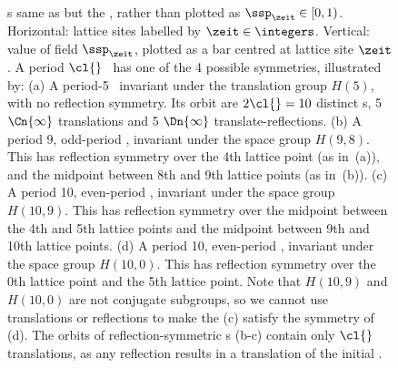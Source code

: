 \begin{description}
\begin{figure}
  \caption{\label{fig:HL1dLatticeStateColor}
{\Lattstate}s same as  but the , rather
than plotted as $\ssp_\zeit\in[0,1)$.
Horizontal: lattice sites labelled by $\zeit\in\integers$.
Vertical: value of
field $\ssp_\zeit$, plotted as a bar centred at lattice site
$\zeit$.
A period $\cl{}$ {\lattstate} \Xx\ has one of the
4 possible symmetries, illustrated by:
(a)
A period-5 {\lattstate} \Xx\ invariant under the translation group
$H(5)$, with no reflection symmetry. Its  orbit are $2\cl{}=10$
distinct {\lattstate}s, 5 $\Cn{\infty}$ translations and 5 $\Dn{\infty}$
translate-reflections.
(b)
A period 9, odd-period {\lattstate}
,
invariant under the space group $H(9,8)$.
This {\lattstate} has reflection
symmetry over the 4th lattice point
(as in \,(a)), and the midpoint between
8th and 9th lattice points (as in \,(b)).
(c)
A period 10, even-period {\lattstate}
,
invariant under the space group $H(10,9)$.
This {\lattstate} has reflection
symmetry over the midpoint between the 4th and 5th lattice points
and the midpoint between 9th and 10th lattice points.
(d)
A period 10, even-period {\lattstate}
,
invariant under the space group $H(10,0)$.
This {\lattstate} has reflection
symmetry over the 0th lattice point and the 5th lattice point.
Note that $H(10,9)$ and $H(10,0)$ are not conjugate subgroups, so we
cannot use translations or reflections to make the {\lattstate} (c)
satisfy the symmetry of {\lattstate} (d).
The \Dn{\cl{}} orbits of reflection-symmetric {\lattstate}s (b-c) contain
only $\cl{}$ {\lattstate} \Cn{\cl{}} translations, as any reflection
results in a translation of the initial {\lattstate}.
          }
\end{figure}


\end{description}
